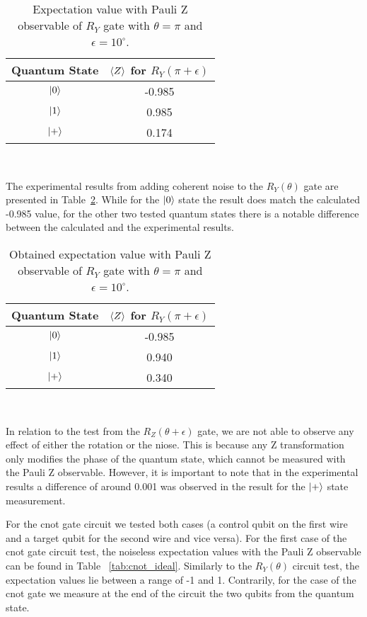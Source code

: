 \begin{table}[h]
  \centering
  \begin{tabular}{|c|c|}
    \hline
    Quantum State & \(\expval{Z}\) for \(R_{Y}\left(\pi+\epsilon\right)\) \\
    \hline
    \(\ket{0}\) & -0.985 \\
    \hline
    \(\ket{1}\) & 0.985 \\
    \hline
    \(\ket{+}\) &  0.174 \\
    \hline
  \end{tabular}
  \caption{Expectation value with Pauli Z observable of \(R_{Y}\) gate with \(\theta = \pi\) and \(\epsilon = 10^{\circ}\).}\label{tab:ry_iso_noise}
\end{table} \

The experimental results from adding coherent noise to the
\(R_{Y}(\theta)\) gate are presented in Table~\ref{tab:ry_real_noise}. 
While for the \(\ket{0}\) state the result does match the calculated
-0.985 value, for the other two tested quantum states there is a
notable difference between the calculated and the experimental results. \

\begin{table}[h]
  \centering
  \begin{tabular}{|c|c|}
    \hline
    Quantum State & \(\expval{Z}\) for \(R_{Y}\left(\pi+\epsilon\right)\) \\
    \hline
    \(\ket{0}\) & -0.985 \\
    \hline
    \(\ket{1}\) & 0.940 \\
    \hline
    \(\ket{+}\) &  0.340 \\
    \hline
  \end{tabular}
  \caption{Obtained expectation value with Pauli Z observable of \(R_{Y}\) gate with \(\theta = \pi\) and \(\epsilon = 10^{\circ}\).}\label{tab:ry_real_noise}
\end{table} \

In relation to the test from the \(R_{Z}(\theta + \epsilon)\) gate, we
are not able to observe any effect of either the rotation or the niose.
This is because any Z transformation only modifies the phase of the
quantum state, which cannot be measured with the Pauli Z observable.
However, it is important to note that in the experimental results
a difference of around 0.001 was observed in the result for the \(\ket{+}\)
state measurement. \

For the \ac{cnot} gate circuit we tested both cases (a control qubit on the
first wire and a target qubit for the second wire and vice versa). For
the first case of the \ac{cnot}  gate circuit test, the noiseless expectation
values with the Pauli Z observable can be found in Table
~\ref{tab:cnot_ideal}. Similarly to the \(R_{Y}(\theta)\) circuit test,
the expectation values lie between a range of -1 and 1. Contrarily,
for the case of the \ac{cnot}  gate we measure at the end of the circuit the
two qubits from the quantum state. \


